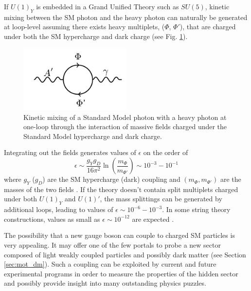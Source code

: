 If $U(1)_Y$ is embedded in a Grand Unified Theory such as $SU(5)$, kinetic mixing between the
SM photon and the heavy photon can naturally be generated at loop-level 
assuming there exists heavy multiplets, ($\Phi$, $\Phi'$), 
that are charged under both the SM hypercharge and dark charge 
(see Fig. \ref{fig:ap_loop}).
\begin{figure}
    \centering
    \includegraphics[width=0.5\textwidth]{images/aprime_loop.png}
    \caption{Kinetic mixing of a Standard Model photon with a heavy photon 
    at one-loop through the interaction of massive fields charged under
    the Standard Model hypercharge and dark charge.}
    \label{fig:ap_loop}
\end{figure}
Integrating out the fields generates values of $\epsilon$ on the order of 
\begin{equation}
    \epsilon \sim \frac{g_Yg_D}{16\pi^2}\ln\left(\frac{m_{\Phi}}{m_{\Phi'}} \right)
             \sim 10^{-3} - 10^{-1} 
\end{equation}
where $g_Y$ ($g_D$) are the SM hypercharge (dark) coupling and 
$(m_{\Phi}, m_{\Phi'})$ are the masses of the two fields 
\cite{ArkaniHamed:2008qp, Bjorken:2009mm}.  If the theory doesn't contain 
split multiplets charged under both $U(1)_Y$ and $U(1)'$, the mass splittings 
can be generated by additional loops, leading to values of $\epsilon \sim 10^{-6} - 10^{-3}$. 
In some string theory constructions, 
values as small as $\epsilon \sim 10^{-12}$ are expected 
\cite{Goodsell:2010ie,Goodsell:2009xc, Cicoli:2011yh}.

%
%

The possibility that a new gauge boson can couple to charged SM particles is 
very appealing.  It may offer one of the few portals to probe a new sector 
composed of light weakly coupled particles and possibly dark matter
(see Section \ref{sec:mot_dm}).  Such a coupling can be exploited by current and future
experimental programs in order to measure the properties of
the hidden sector and possibly provide insight into many outstanding physics 
puzzles.

